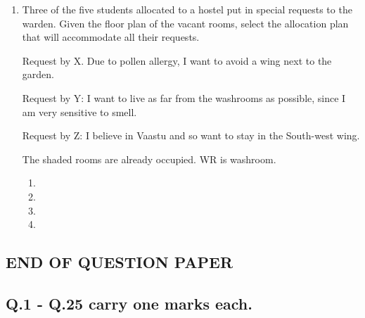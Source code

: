 \documentclass[journal]{IEEEtran}
\begin{document}
\begin{enumerate}
\begin{multicols}{4}
    \begin{enumerate}
        \item $1000$
        \item $975$
        \item $900$
        \item $225$
    \end{enumerate}
\end{multicols}
\newpage
    \item Three of the five students allocated to a hostel put in special requests to the warden. Given the floor plan of the vacant rooms, select the allocation plan that will accommodate all their requests.

Request by X. Due to pollen allergy, I want to avoid a wing next to the garden. 

Request by Y: I want to live as far from the washrooms as possible, since I am very sensitive to smell.

Request by Z: I believe in Vaastu and so want to stay in the South-west wing.

The shaded rooms are already occupied. WR is washroom.
\begin{multicols}{2}
    \begin{enumerate}
        \item 
        \item 
        \item 
        \item 
    \end{enumerate}
\end{multicols}
\end{enumerate}
\begin{center}
    \subsection*{END OF QUESTION PAPER}
\end{center}
    
\newpage

\subsection*{\textbf{Q.1 - Q.25 carry one marks each.}}
\end{document}
